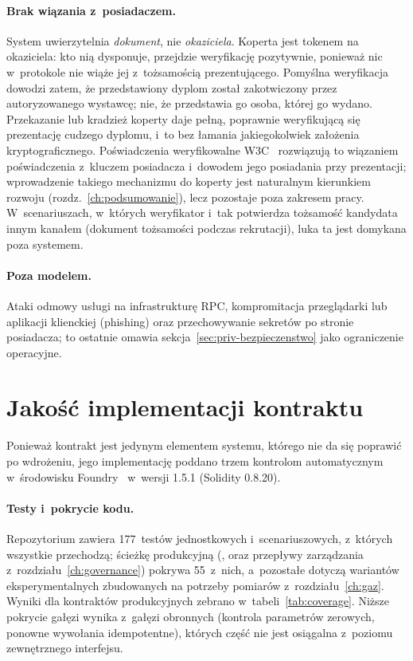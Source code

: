 \paragraph{Brak wiązania z~posiadaczem.} System uwierzytelnia \emph{dokument},
nie \emph{okaziciela}. Koperta jest tokenem na okaziciela: kto nią dysponuje,
przejdzie weryfikację pozytywnie, ponieważ nic w~protokole nie wiąże jej
z~tożsamością prezentującego. Pomyślna weryfikacja dowodzi zatem, że przedstawiony
dyplom został zakotwiczony przez autoryzowanego wystawcę; nie, że przedstawia
go osoba, której go wydano. Przekazanie lub kradzież koperty daje pełną,
poprawnie weryfikującą się prezentację cudzego dyplomu, i~to bez łamania
jakiegokolwiek założenia kryptograficznego. Poświadczenia weryfikowalne
W3C~\cite{w3c-vc} rozwiązują to wiązaniem poświadczenia z~kluczem posiadacza
i~dowodem jego posiadania przy prezentacji; wprowadzenie takiego mechanizmu do
koperty jest naturalnym kierunkiem rozwoju (rozdz.~\ref{ch:podsumowanie}), lecz
pozostaje poza zakresem pracy. W~scenariuszach, w~których weryfikator i~tak
potwierdza tożsamość kandydata innym kanałem (dokument tożsamości podczas
rekrutacji), luka ta jest domykana poza systemem.

\paragraph{Poza modelem.} Ataki odmowy usługi na infrastrukturę RPC,
kompromitacja przeglądarki lub aplikacji klienckiej (phishing) oraz
przechowywanie sekretów po stronie posiadacza; to ostatnie omawia
sekcja~\ref{sec:priv-bezpieczenstwo} jako ograniczenie operacyjne.

\section{Jakość implementacji kontraktu}
\label{sec:jakosc-kontraktu}

Ponieważ kontrakt jest jedynym elementem systemu, którego nie da się poprawić po
wdrożeniu, jego implementację poddano trzem kontrolom automatycznym w~środowisku
Foundry~\cite{foundry} w~wersji 1.5.1 (Solidity 0.8.20).

\paragraph{Testy i~pokrycie kodu.} Repozytorium zawiera 177~testów jednostkowych
i~scenariuszowych, z~których wszystkie przechodzą; ścieżkę produkcyjną
(,  oraz przepływy zarządzania
z~rozdziału~\ref{ch:governance}) pokrywa 55~z~nich, a~pozostałe dotyczą
wariantów eksperymentalnych zbudowanych na potrzeby pomiarów
z~rozdziału~\ref{ch:gaz}. Wyniki  dla kontraktów
produkcyjnych zebrano w~tabeli~\ref{tab:coverage}. Niższe pokrycie gałęzi wynika
z~gałęzi obronnych (kontrola parametrów zerowych, ponowne wywołania idempotentne),
których część nie jest osiągalna z~poziomu zewnętrznego interfejsu.

